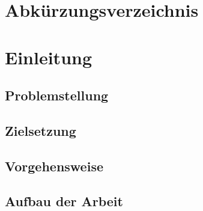 \documentclass[12pt,a4paper,oneside]{article}
\begin{document}
\pagestyle{plain}

\newpage



\setcounter{page}{2}

\pagestyle{fancy}
\fancyhf{}
\renewcommand{\headrulewidth}{0.0pt} %
\fancyhead[C]{\nouppercase{\color{gray}{\thepage}}}
\tableofcontents{}

\clearpage
{}
{}
\section*{Abkürzungsverzeichnis}



\clearpage
{}
{}
\listoftables
\clearpage
\onehalfspacing

\section{Einleitung}
\subsection{Problemstellung}

\subsection{Zielsetzung}

\subsection{Vorgehensweise}

\subsection{Aufbau der Arbeit}

\clearpage
\end{document}
